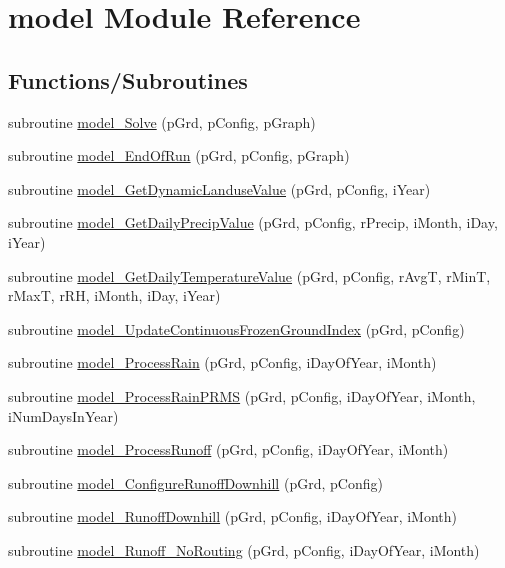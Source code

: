 \hypertarget{namespacemodel}{
\section{model Module Reference}
\label{namespacemodel}
}
\subsection*{Functions/Subroutines}
\begin{DoxyCompactItemize}
\item 
subroutine \hyperlink{namespacemodel_a74378024436fef2323c5d8e78ae80789}{model\_\-Solve} (pGrd, pConfig, pGraph)
\item 
subroutine \hyperlink{namespacemodel_a114e44d3df7dfb8dc151a50dc04b0f54}{model\_\-EndOfRun} (pGrd, pConfig, pGraph)
\item 
subroutine \hyperlink{namespacemodel_a2f244ceb6a9954fc0f3854eda7fe237b}{model\_\-GetDynamicLanduseValue} (pGrd, pConfig, iYear)
\item 
subroutine \hyperlink{namespacemodel_ac13ac612394e6b11e1396e3a8f288b9a}{model\_\-GetDailyPrecipValue} (pGrd, pConfig, rPrecip, iMonth, iDay, iYear)
\item 
subroutine \hyperlink{namespacemodel_af8d22bdc2b1a6d127e2a5df3e587bec6}{model\_\-GetDailyTemperatureValue} (pGrd, pConfig, rAvgT, rMinT, rMaxT, rRH, iMonth, iDay, iYear)
\item 
subroutine \hyperlink{namespacemodel_ab74d4dbaafe53d302dd25391d9c43a68}{model\_\-UpdateContinuousFrozenGroundIndex} (pGrd, pConfig)
\item 
subroutine \hyperlink{namespacemodel_a121eef11acd312dcdd0ea21317c127ef}{model\_\-ProcessRain} (pGrd, pConfig, iDayOfYear, iMonth)
\item 
subroutine \hyperlink{namespacemodel_a6f38fcc336f9a766a37edf7771cf5285}{model\_\-ProcessRainPRMS} (pGrd, pConfig, iDayOfYear, iMonth, iNumDaysInYear)
\item 
subroutine \hyperlink{namespacemodel_a546c0d970e2db00e9f958a1a55f958ba}{model\_\-ProcessRunoff} (pGrd, pConfig, iDayOfYear, iMonth)
\item 
subroutine \hyperlink{namespacemodel_a2ea58c4ccfc2647d6db92e5ca190f79a}{model\_\-ConfigureRunoffDownhill} (pGrd, pConfig)
\item 
subroutine \hyperlink{namespacemodel_ab0f15bf6283861e18b4df7cb3ade2820}{model\_\-RunoffDownhill} (pGrd, pConfig, iDayOfYear, iMonth)
\item 
subroutine \hyperlink{namespacemodel_ae7fa0deca3e98388f15ccdd73dff4241}{model\_\-Runoff\_\-NoRouting} (pGrd, pConfig, iDayOfYear, iMonth)

\end{DoxyCompactItemize}
